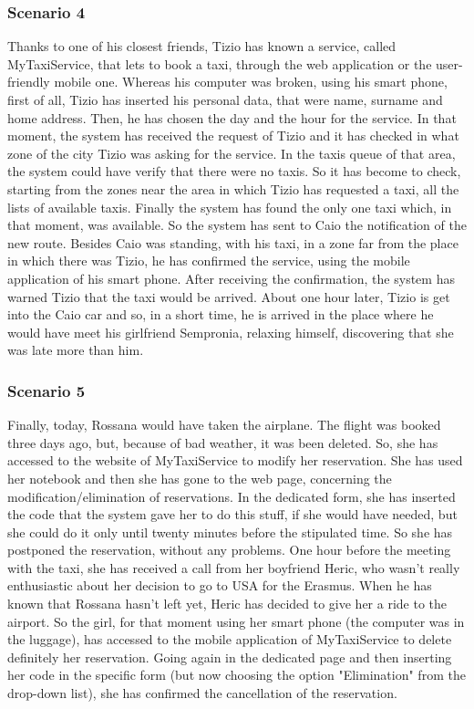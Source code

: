 		\subsubsection{Scenario 4}
		Thanks to one of his closest friends, Tizio has known a service, called MyTaxiService, that lets to book a taxi, through the web application or the user-friendly mobile one.
		Whereas his computer was broken, using his smart phone, first of all, Tizio has inserted his personal data, that were name, surname and home address. Then, he has chosen the day and the hour for the service. In that moment, the system has received the request of Tizio and it has checked in what zone of the city Tizio was asking for the service. In the taxis queue of that area, the system could have verify that there were no taxis. So it has become to check, starting from the zones near the area in which Tizio has requested a taxi, all the lists of available taxis. 
		Finally the system has found the only one taxi which, in that moment, was available. So the system has sent to Caio the notification of the new route. Besides Caio was standing, with his taxi, in a zone far from the place in which there was Tizio, he has confirmed the service, using the mobile application of his smart phone. After receiving the confirmation, the system has warned Tizio that the taxi would be arrived.
		About one hour later, Tizio is get into the Caio car and so, in a short time, he is arrived in the place where he would have meet his girlfriend Sempronia, relaxing himself, discovering that she was late more than him.

		\subsubsection{Scenario 5}
		Finally, today, Rossana would have taken the airplane. The flight was booked three days ago, but, because of bad weather, it was been deleted. So, she has accessed to the website of MyTaxiService to modify her reservation. She has used her notebook and then she has gone to the web page, concerning the modification/elimination of reservations. In the dedicated form, she has inserted the code that the system gave her to do this stuff, if she would have needed, but she could do it only until twenty minutes before the stipulated time. So she has postponed the reservation, without any problems.
		One hour before the meeting with the taxi, she has received a call from her boyfriend Heric, who wasn't really enthusiastic about her decision to go to USA for the Erasmus. When he has known that Rossana hasn't left yet, Heric has decided to give her a ride to the airport. So the girl, for that moment using her smart phone (the computer was in the luggage), has accessed to the mobile application of MyTaxiService to delete definitely her reservation. Going again in the dedicated page and then inserting her code in the specific form (but now choosing the option "Elimination" from the drop-down list), she has confirmed the cancellation of the reservation. 
		
